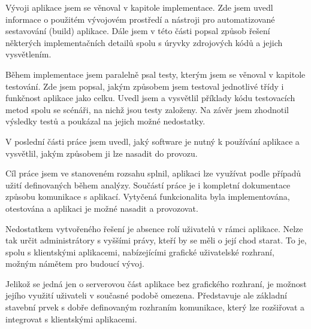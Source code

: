 \documentclass[thesis=B,czech]{FITthesis}[2012/06/26]
\begin{document}
\begin{conclusion}
	Vývoji aplikace jsem se věnoval v kapitole implementace. Zde jsem uvedl informace o použitém vývojovém prostředí a nástroji pro automatizované sestavování (build) aplikace. Dále jsem v této části popsal způsob řešení některých implementačních detailů spolu s úryvky zdrojových kódů a jejich vysvětlením. 
	
	Během implementace jsem paralelně psal testy, kterým jsem se věnoval v kapitole testování. Zde jsem popsal, jakým způsobem jsem testoval jednotlivé třídy i funkčnost aplikace jako celku. Uvedl jsem a vysvětlil příklady kódu testovacích metod spolu se scénáři, na nichž jsou testy založeny. Na závěr jsem zhodnotil výsledky testů a poukázal na jejich možné nedostatky.
	
	V poslední části práce jsem uvedl, jaký software je nutný k používání aplikace a vysvětlil, jakým způsobem ji lze nasadit do provozu. 
	
	
	Cíl práce jsem ve stanoveném rozsahu splnil, aplikaci lze využívat podle případů užití definovaných během analýzy. Součástí práce je i kompletní dokumentace způsobu komunikace s aplikací. Vytyčená funkcionalita byla implementována, otestována a aplikaci je možné nasadit a provozovat.
	
	Nedostatkem vytvořeného řešení je absence rolí uživatelů v rámci aplikace. Nelze tak určit administrátory s vyššími právy, kteří by se měli o její chod starat. To je, spolu s klientskými aplikacemi, nabízejícími grafické uživatelské rozhraní, možným námětem pro budoucí vývoj.
	
	Jelikož se jedná jen o serverovou část aplikace bez grafického rozhraní, je možnost jejího využití uživateli v současné podobě omezena. Představuje ale základní stavební prvek s dobře definovaným rozhraním komunikace, který lze rozšiřovat a integrovat s klientskými aplikacemi.
	
	
	 
	 
\end{conclusion}


\end{document}
